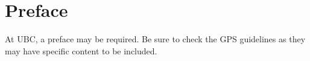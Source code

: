 
\chapter{Preface}

At \ac{UBC}, a preface may be required.  Be sure to check the
\ac{GPS} guidelines as they may have specific content to be included.